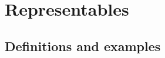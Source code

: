 \chapter{Representables}



\section{Definitions and examples}
\addtocounter{subsection}{25}








